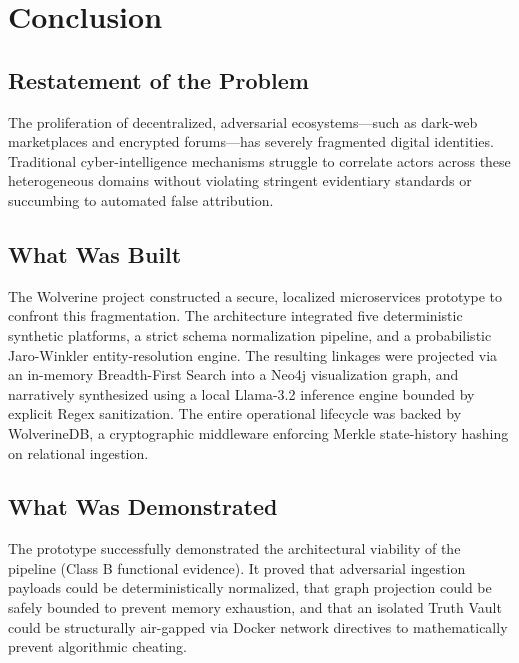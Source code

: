 \chapter{Conclusion}
\label{ch:conclusion}

\section{Restatement of the Problem}
\label{sec:conc-problem}
The proliferation of decentralized, adversarial ecosystems---such as dark-web marketplaces and encrypted forums---has severely fragmented digital identities. Traditional cyber-intelligence mechanisms struggle to correlate actors across these heterogeneous domains without violating stringent evidentiary standards or succumbing to automated false attribution. 

\section{What Was Built}
\label{sec:conc-built}
The Wolverine project constructed a secure, localized microservices prototype to confront this fragmentation. The architecture integrated five deterministic synthetic platforms, a strict schema normalization pipeline, and a probabilistic Jaro-Winkler entity-resolution engine. The resulting linkages were projected via an in-memory Breadth-First Search into a Neo4j visualization graph, and narratively synthesized using a local Llama-3.2 inference engine bounded by explicit Regex sanitization. The entire operational lifecycle was backed by WolverineDB, a cryptographic middleware enforcing Merkle state-history hashing on relational ingestion.

\section{What Was Demonstrated}
\label{sec:conc-demonstrated}
The prototype successfully demonstrated the architectural viability of the pipeline (Class B functional evidence). It proved that adversarial ingestion payloads could be deterministically normalized, that graph projection could be safely bounded to prevent memory exhaustion, and that an isolated Truth Vault could be structurally air-gapped via Docker network directives to mathematically prevent algorithmic cheating.

